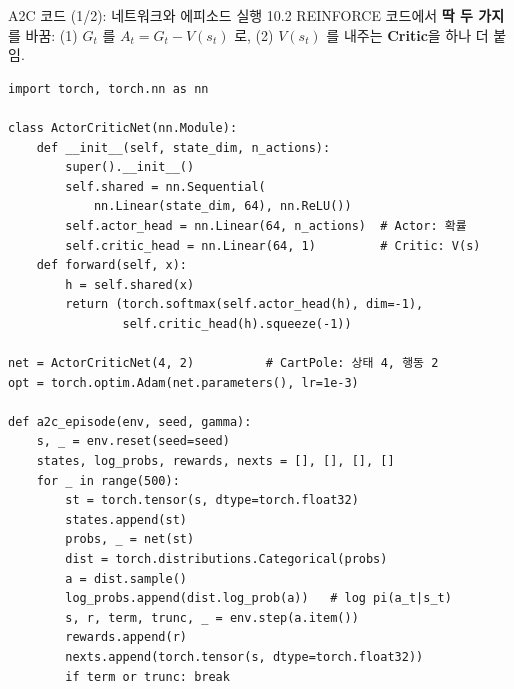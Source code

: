 \documentclass[aspectratio=169,11pt]{beamer}
\begin{document}

\begin{frame}[fragile]{A2C 코드 (1/2): 네트워크와 에피소드 실행}
  10.2 REINFORCE 코드에서 \textbf{딱 두 가지}를 바꿈:
  (1) $G_t$ 를 $A_t = G_t - V(s_t)$ 로,
  (2) $V(s_t)$ 를 내주는 \textbf{Critic}을 하나 더 붙임.
\begin{lstlisting}
import torch, torch.nn as nn

class ActorCriticNet(nn.Module):
    def __init__(self, state_dim, n_actions):
        super().__init__()
        self.shared = nn.Sequential(
            nn.Linear(state_dim, 64), nn.ReLU())
        self.actor_head = nn.Linear(64, n_actions)  # Actor: 확률
        self.critic_head = nn.Linear(64, 1)         # Critic: V(s)
    def forward(self, x):
        h = self.shared(x)
        return (torch.softmax(self.actor_head(h), dim=-1),
                self.critic_head(h).squeeze(-1))

net = ActorCriticNet(4, 2)          # CartPole: 상태 4, 행동 2
opt = torch.optim.Adam(net.parameters(), lr=1e-3)

def a2c_episode(env, seed, gamma):
    s, _ = env.reset(seed=seed)
    states, log_probs, rewards, nexts = [], [], [], []
    for _ in range(500):
        st = torch.tensor(s, dtype=torch.float32)
        states.append(st)
        probs, _ = net(st)
        dist = torch.distributions.Categorical(probs)
        a = dist.sample()
        log_probs.append(dist.log_prob(a))   # log pi(a_t|s_t)
        s, r, term, trunc, _ = env.step(a.item())
        rewards.append(r)
        nexts.append(torch.tensor(s, dtype=torch.float32))
        if term or trunc: break
\end{lstlisting}
\end{frame}
\end{document}
